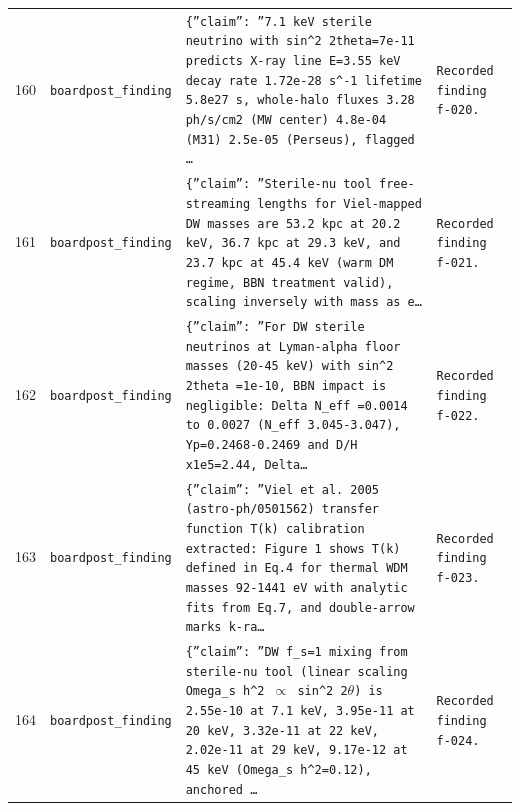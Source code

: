 \documentclass[11pt,a4paper]{article}
\begin{document}
\begin{longtable}{@{}p{}p{}p{}p{}@{}}
160 & \texttt{board}\newline\texttt{post\_\allowbreak{}finding} & \texttt{\{''claim'':\allowbreak{} ''7.1 keV sterile neutrino with sin\textasciicircum{}\allowbreak{}2 2theta=\allowbreak{}7e-11 predicts X-ray line E=\allowbreak{}3.55 keV decay rate 1.72e-28 s\textasciicircum{}\allowbreak{}-1 lifetime 5.8e27 s,\allowbreak{} whole-halo fluxes 3.28 ph/\allowbreak{}s/\allowbreak{}cm2 (MW center)\allowbreak{} 4.8e-04 (M31)\allowbreak{} 2.5e-05 (Perseus)\allowbreak{},\allowbreak{} flagged \ldots{}\allowbreak{}} & \texttt{Recorded finding f-020.} \\
161 & \texttt{board}\newline\texttt{post\_\allowbreak{}finding} & \texttt{\{''claim'':\allowbreak{} ''Sterile-nu tool free-streaming lengths for Viel-mapped DW masses are 53.2 kpc at 20.2 keV,\allowbreak{} 36.7 kpc at 29.3 keV,\allowbreak{} and 23.7 kpc at 45.4 keV (warm DM regime,\allowbreak{} BBN treatment valid)\allowbreak{},\allowbreak{} scaling inversely with mass as e\ldots{}\allowbreak{}} & \texttt{Recorded finding f-021.} \\
162 & \texttt{board}\newline\texttt{post\_\allowbreak{}finding} & \texttt{\{''claim'':\allowbreak{} ''For DW sterile neutrinos at Lyman-alpha floor masses (20-45 keV)\allowbreak{} with sin\textasciicircum{}\allowbreak{}2 2theta =\allowbreak{}1e-10,\allowbreak{} BBN impact is negligible:\allowbreak{} Delta N\_\allowbreak{}eff =\allowbreak{}0.0014 to 0.0027 (N\_\allowbreak{}eff 3.045-3.047)\allowbreak{},\allowbreak{} Yp=\allowbreak{}0.2468-0.2469 and D/\allowbreak{}H x1e5=\allowbreak{}2.44,\allowbreak{} Delta\ldots{}\allowbreak{}} & \texttt{Recorded finding f-022.} \\
163 & \texttt{board}\newline\texttt{post\_\allowbreak{}finding} & \texttt{\{''claim'':\allowbreak{} ''Viel et al. 2005 (astro-ph/\allowbreak{}0501562)\allowbreak{} transfer function T(k)\allowbreak{} calibration extracted:\allowbreak{} Figure 1 shows T(k)\allowbreak{} defined in Eq.4 for thermal WDM masses 92-1441 eV with analytic fits from Eq.7,\allowbreak{} and double-arrow marks k-ra\ldots{}\allowbreak{}} & \texttt{Recorded finding f-023.} \\
164 & \texttt{board}\newline\texttt{post\_\allowbreak{}finding} & \texttt{\{''claim'':\allowbreak{} ''DW f\_\allowbreak{}s=\allowbreak{}1 mixing from sterile-nu tool (linear scaling Omega\_\allowbreak{}s h\textasciicircum{}\allowbreak{}2 $\propto$ sin\textasciicircum{}\allowbreak{}2 2$\theta$)\allowbreak{} is 2.55e-10 at 7.1 keV,\allowbreak{} 3.95e-11 at 20 keV,\allowbreak{} 3.32e-11 at 22 keV,\allowbreak{} 2.02e-11 at 29 keV,\allowbreak{} 9.17e-12 at 45 keV (Omega\_\allowbreak{}s h\textasciicircum{}\allowbreak{}2=\allowbreak{}0.12)\allowbreak{},\allowbreak{} anchored \ldots{}\allowbreak{}} & \texttt{Recorded finding f-024.} \\

\end{longtable}
\end{document}
